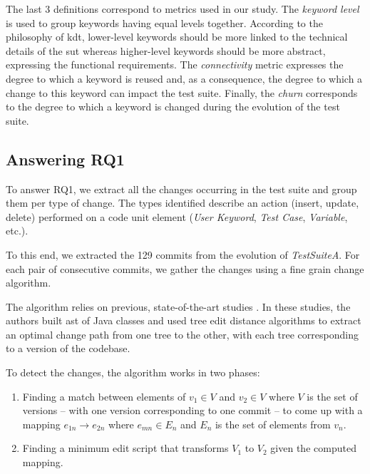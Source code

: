 The last 3 definitions correspond to metrics used in our study. The \emph{keyword level} is used to group keywords having equal levels together. According to the philosophy of \gls{kdt}, lower-level keywords should be more linked to the technical details of the \gls{sut} whereas higher-level keywords should be more abstract, expressing the functional requirements. The \emph{ connectivity} metric expresses the degree to which a keyword is reused and, as a consequence, the degree to which a change to this keyword can impact the test suite. Finally, the \emph{churn} corresponds to the degree to which a keyword is changed during the evolution of the test suite.

\subsection{Answering RQ1}
\label{sec:evolution-protocol-rq1}

To answer RQ1, we extract all the changes occurring in the test suite and group them per type of change. The types identified describe an action (insert, update, delete) performed on a code unit element (\emph{User Keyword}, \emph{Test Case}, \emph{Variable}, etc.). 

To this end, we extracted the 129 commits from the evolution of \emph{TestSuiteA}. For each pair of consecutive commits, we gather the changes using a fine grain change algorithm.

The algorithm relies on previous, state-of-the-art studies \cite{Chawathe1996, Falleri2014, Fluri2007, Pinto2012}. In these studies, the authors built \gls{ast} of Java classes and used tree edit distance algorithms to extract an optimal change path from one tree to the other, with each tree corresponding to a version of the codebase.

To detect the changes, the algorithm works in two phases:

\begin{enumerate}
    \item Finding a match between elements of $v_1 \in V$ and $v_2 \in V$ where $V$ is the set of versions -- with one version corresponding to one commit -- to come up with a mapping $e_{1n} \rightarrow e_{2n}$ where $e_{mn} \in E_n$ and $E_n$ is the set of elements from $v_n$.
  
    \item Finding a minimum edit script that transforms $V_1$ to $V_2$ given the computed mapping.
\end{enumerate}

